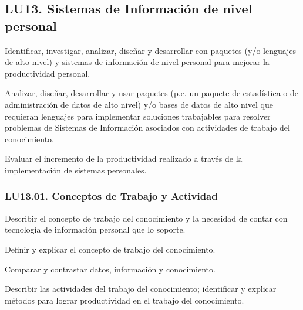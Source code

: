 \subsection{LU13. Sistemas de Información de nivel personal}\label{sec:BOK-LU13}\label{sec:LU13}
\begin{LearningUnit}
\begin{LUGoal}
\item Identificar, investigar, analizar, diseñar y desarrollar con paquetes (y/o lenguajes de alto nivel) y sistemas de información de nivel personal para mejorar la productividad personal.
\end{LUGoal}

\begin{LUObjective}
\item Analizar, diseñar, desarrollar y usar paquetes (p.e. un paquete de estadística o de administración de datos de alto nivel) y/o bases de datos de alto nivel que requieran lenguajes para implementar soluciones trabajables para resolver problemas de Sistemas de Información asociados con actividades de trabajo del conocimiento.
\item Evaluar el incremento de la productividad realizado a través de la implementación de sistemas personales.
\end{LUObjective}
\end{LearningUnit}

\subsubsection{LU13.01. Conceptos de Trabajo y Actividad}\label{sec:BOK-LU13.01}\label{sec:LU13.01}
\begin{LearningUnit}
\begin{LUGoal}
\item Describir el concepto de trabajo del conocimiento y la necesidad de contar con tecnología de información personal que lo soporte.
\end{LUGoal}

\begin{LUObjective}
\item Definir y explicar el concepto de trabajo del conocimiento.
\item Comparar y contrastar datos, información y conocimiento.
\item Describir las actividades del trabajo del conocimiento; identificar y explicar métodos para lograr productividad en el trabajo del conocimiento.
\end{LUObjective}
\end{LearningUnit}

